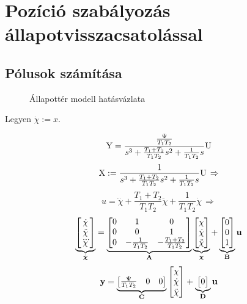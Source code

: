 \section{Pozíció szabályozás állapotvisszacsatolással}

\subsection{Pólusok számítása}

\begin{figure}[H]
    \centering
    \caption{Állapottér modell hatásvázlata}
    \label{fig:6a_allapotter_hatasvazlat}
\end{figure}


Legyen $\dot{\chi}:=x$.

\begin{equation}
	\mathrm{Y} = \frac{\frac{\Psi}{T_1T_2}}{s^3+\frac{T_1+T_2}{T_1T_2}s^2+\frac{1}{T_1T_2}s}\mathrm{U}
\end{equation}
\begin{equation}
	\mathrm{X} := \frac{1}{s^3+\frac{T_1+T_2}{T_1T_2}s^2+\frac{1}{T_1T_2}s}\mathrm{U}\,\Rightarrow
\end{equation}
\begin{equation}
	u = \dddot{\chi} + \frac{T_1+T_2}{T_1T_2}\ddot{\chi} + \frac{1}{T_1T_2}\dot{\chi}\,\Rightarrow
\end{equation}
\begin{equation}
	\underbrace{\begin{bmatrix}\dot{\chi}\\\ddot{\chi}\\\dddot{\chi}\end{bmatrix}}_{\dot{\boldsymbol{\mathrm{\chi}} }}
	= \underbrace{\begin{bmatrix}0&1&0\\0&0&1\\0&-\frac{1}{T_1T_2}&-\frac{T_1+T_2}{T_1T_2}\end{bmatrix}}_{\boldsymbol{\mathrm{A}}}
	\underbrace{\begin{bmatrix}\chi\\\dot{\chi}\\\ddot{\chi}\end{bmatrix}}_{\boldsymbol{\mathrm{\chi}}}
	+ \underbrace{\begin{bmatrix}0\\0\\1\end{bmatrix}}_{\boldsymbol{\mathrm{B}}}\boldsymbol{\mathrm{u}}
\end{equation}
\begin{equation}
	\boldsymbol{\mathrm{y}} = \underbrace{\begin{bmatrix}\frac{\Psi}{T_1T_2}&0&0\end{bmatrix}}_{\boldsymbol{\mathrm{C}}}\begin{bmatrix}\chi\\\dot{\chi}\\\ddot{\chi}\end{bmatrix} + \underbrace{\begin{bmatrix}0\end{bmatrix}}_{\boldsymbol{\mathrm{D}}}\boldsymbol{\mathrm{u}}
\end{equation}

